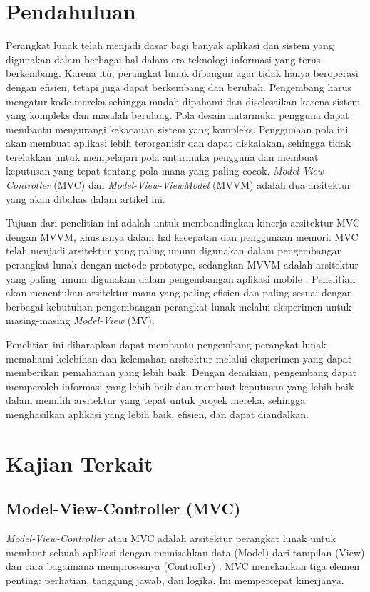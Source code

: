 \documentclass[conference]{IEEEtran}
\begin{document}
\section{Pendahuluan}
Perangkat lunak telah menjadi dasar bagi banyak aplikasi dan sistem yang digunakan dalam berbagai hal dalam era teknologi informasi yang terus berkembang. Karena itu, perangkat lunak dibangun agar tidak hanya beroperasi dengan efisien, tetapi juga dapat berkembang dan berubah. Pengembang harus mengatur kode mereka sehingga mudah dipahami dan diselesaikan karena sistem yang kompleks dan masalah berulang. Pola desain antarmuka pengguna dapat membantu mengurangi kekacauan sistem yang kompleks. Penggunaan pola ini akan membuat aplikasi lebih terorganisir dan dapat diskalakan, sehingga tidak terelakkan untuk mempelajari pola antarmuka pengguna dan membuat keputusan yang tepat tentang pola mana yang paling cocok\cite{Perbandingan4}. \textit{Model-View-Controller} (MVC) dan \textit{Model-View-ViewModel} (MVVM) adalah dua arsitektur yang akan dibahas dalam artikel ini.

Tujuan dari penelitian ini adalah untuk membandingkan kinerja arsitektur MVC dengan MVVM, khususnya dalam hal kecepatan dan penggunaan memori. MVC telah menjadi arsitektur yang paling umum digunakan dalam pengembangan perangkat lunak dengan metode prototype, sedangkan MVVM adalah arsitektur yang paling umum digunakan dalam pengembangan aplikasi mobile \cite{Perbandingan4}. Penelitian akan menentukan arsitektur mana yang paling efisien dan paling sesuai dengan berbagai kebutuhan pengembangan perangkat lunak melalui eksperimen untuk masing-masing \textit{Model-View} (MV). 

Penelitian ini diharapkan dapat membantu pengembang perangkat lunak memahami kelebihan dan kelemahan arsitektur melalui eksperimen yang dapat memberikan pemahaman yang lebih baik. Dengan demikian, pengembang dapat memperoleh informasi yang lebih baik dan membuat keputusan yang lebih baik dalam memilih arsitektur yang tepat untuk proyek mereka, sehingga menghasilkan aplikasi yang lebih baik, efisien, dan dapat diandalkan.


\section{Kajian Terkait}

\subsection{Model-View-Controller (MVC)}
\textit{Model-View-Controller} atau MVC adalah arsitektur perangkat lunak untuk membuat sebuah aplikasi dengan memisahkan data (Model) dari tampilan (View) dan cara bagaimana memprosesnya (Controller)\cite{Perbandingan4} \cite{MVC} . MVC menekankan tiga elemen penting: perhatian, tanggung jawab, dan logika. Ini mempercepat kinerjanya.
\end{document}
